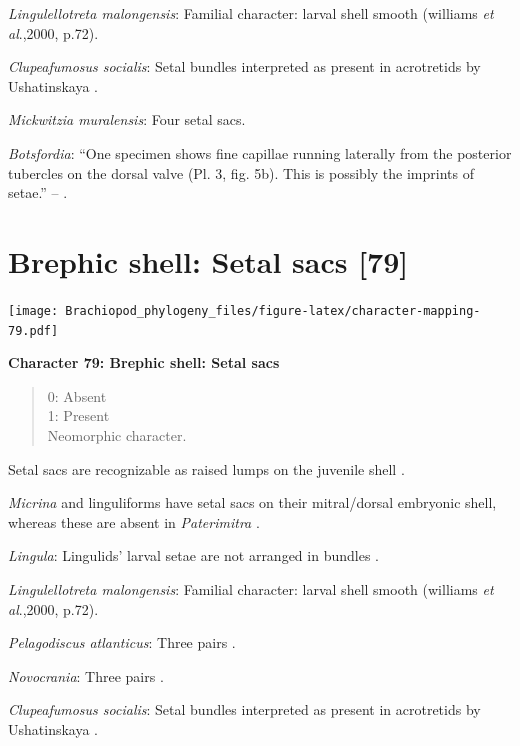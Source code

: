 \documentclass[]{book}
\theoremstyle{definition}
\theoremstyle{definition}
\theoremstyle{definition}
\theoremstyle{remark}
\begin{document}
\emph{Lingulellotreta malongensis}: Familial character: larval shell
smooth (williams \emph{et al}.,2000, p.72).

\emph{Clupeafumosus socialis}: Setal bundles interpreted as present in
acrotretids by Ushatinskaya \citeyearpar{Ushatinskaya2016Protegulumand}.

\emph{Mickwitzia muralensis}: Four setal sacs.

\emph{Botsfordia}: ``One specimen shows fine capillae running laterally
from the posterior tubercles on the dorsal valve (Pl. 3, fig. 5b). This
is possibly the imprints of setae.'' --
\citet{Ushatinskaya2016Revisionof}.

\hypertarget{brephic-shell-setal-sacs-79}{%
\section{Brephic shell: Setal sacs
{[}79{]}}\label{brephic-shell-setal-sacs-79}}

\texttt{[image: Brachiopod\_phylogeny\_files/figure-latex/character-mapping-79.pdf]}

\textbf{Character 79: Brephic shell: Setal sacs}

\begin{quote}
0: Absent\\
1: Present\\
Neomorphic character.
\end{quote}

Setal sacs are recognizable as raised lumps on the juvenile shell
\citep[see][]{Bassett2017Earliestontogeny}.

\emph{Micrina} and linguliforms have setal sacs on their mitral/dorsal
embryonic shell, whereas these are absent in \emph{Paterimitra}
\citep{Holmer2011Firstrecord}.

\emph{Lingula}: Lingulids' larval setae are not arranged in bundles
\citep{Carlson1995Phylogeneticrelationships}.

\emph{Lingulellotreta malongensis}: Familial character: larval shell
smooth (williams \emph{et al}.,2000, p.72).

\emph{Pelagodiscus atlanticus}: Three pairs
\citep{Carlson1995Phylogeneticrelationships}.

\emph{Novocrania}: Three pairs
\citep{Carlson1995Phylogeneticrelationships}.

\emph{Clupeafumosus socialis}: Setal bundles interpreted as present in
acrotretids by Ushatinskaya \citeyearpar{Ushatinskaya2016Protegulumand}.
\end{document}
